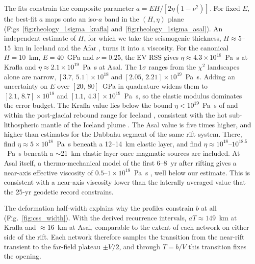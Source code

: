 \documentclass[extra]{gji}
\begin{document}
The fits constrain the composite parameter $a = EH/[2\eta(1-\nu^2)]$.
For fixed $E$, the best-fit $a$ maps onto an iso-$a$
band in the $(H,\eta)$ plane
(Figs~\ref{fig:rheology_1sigma_krafla} and~\ref{fig:rheology_1sigma_asal}).
An independent estimate of $H$, for which we take the seismogenic
thickness, $H \approx 5$--$15$~km in Iceland and the Afar
\citep{stevens2021tectonic,plasman2017lithospheric,weinstein2017fault},
turns it into a viscosity.  For the canonical $H = 10$~km, $E = 40$~GPa and
$\nu = 0.25$, the EV RSS gives $\eta \approx 4.3\times10^{18}$~Pa~s at
Krafla and $\eta \approx 2.1\times10^{19}$~Pa~s at Asal.  The 1$\sigma$
ranges from the $\chi^2$ landscapes alone are narrow,
$[3.7,\,5.1]\times10^{18}$ and $[2.05,\,2.21]\times10^{19}$~Pa~s.  Adding
an uncertainty on $E$ over $[20,\,80]$~GPa in quadrature widens them to
$[2.1,\,8.7]\times10^{18}$ and $[1.1,\,4.3]\times10^{19}$~Pa~s, so the
elastic modulus dominates the error budget.  The Krafla value
lies below the bound $\eta < 10^{19}$~Pa~s of
\citet{sigmundsson1991postglacial} and within the post-glacial rebound
range for Iceland \citep{sigmundsson2010geodetic}, consistent with the hot
sub-lithospheric mantle of the Iceland plume \citep{holtzman2016questions}.
The Asal value is five times higher, and higher than estimates for the
Dabbahu segment of the same rift system.  There, \citet{nooner2009post}
find $\eta \approx 5\times10^{18}$~Pa~s beneath a 12--14~km elastic layer,
and \citet{hamling2014insar} find $\eta \approx 10^{18}$--$10^{18.5}$~Pa~s
beneath a $\sim$21~km elastic layer once magmatic sources are included.  At Asal itself, a thermo-mechanical model of
the first 6--8~yr after rifting gives a near-axis effective viscosity of
$0.5$--$1\times10^{18}$~Pa~s \citep[][Fig.~\ref{fig:rheology_1sigma_asal}]{cattin2005numerical},
well below our estimate.  This is consistent with a near-axis viscosity
lower than the laterally averaged value that the 25-yr geodetic record
constrains.

The deformation half-width explains why the profiles constrain $b$ at all
(Fig.~\ref{fig:css_width}).  With the derived recurrence intervals,
$aT \approx 149$~km at Krafla and $\approx16$~km at Asal, comparable to the
extent of each network on either side of the rift.  Each network therefore
samples the transition from the near-rift transient to the far-field
plateau $\pm V/2$, and through $T = b/V$ this transition fixes the
opening.
\end{document}

